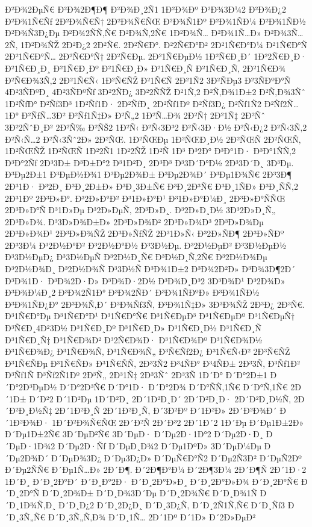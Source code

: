 {Ð²Ð¾2ÐµÑ€
Ð²Ð¾2Ð¶Ð¶
Ð²Ð¾Ð¸2Ñ1
1Ð²Ð¾Ðº
Ð²Ð¾3Ð¼2
Ð²Ð¾Ð¿2
Ð²Ð¾1Ñ€Ñƒ
2Ð²Ð¾Ñ€Ñ†
2Ð²Ð¾Ñ€ÑŒ
Ð²Ð¾Ñ1Ðº
Ð²Ð¾1ÑÐ¼
Ð²Ð¾1ÑÐ½
Ð²Ð¾Ñ3Ð¿Ðµ
Ð²Ð¾2ÑÑ‚Ñ€
Ð²Ð¾Ñ‚2Ñ€
1Ð²Ð¾Ñ…
Ð²Ð¾1Ñ…Ð»
Ð²Ð¾3Ñ…2Ñ‚
1Ð²Ð¾ÑŽ
2Ð²Ð¿2
2Ð²Ñ€.
2Ð²Ñ€Ð°.
Ð²2Ñ€Ð°Ð²
2Ð²1Ñ€Ð°Ð¼
Ð²1Ñ€Ð°Ñ
2Ð²1Ñ€Ð°Ñ…
2Ð²Ñ€Ð°Ñ†
2Ð²Ñ€Ðµ.
2Ð²1Ñ€ÐµÐ½
1Ð²Ñ€Ð¸Ð´
1Ð²2Ñ€Ð¸Ð·
Ð²1Ñ€Ð¸Ð¸
Ð²1Ñ€Ð¸Ðº
Ð²1Ñ€Ð¸Ð»
Ð²1Ñ€Ð¸Ñ
Ð²1Ñ€Ð¸Ñ‚
2Ð²1Ñ€Ð¾
Ð²Ñ€Ð¾3Ñ‚2
2Ð²1Ñ€Ñ‹
1Ð²Ñ€ÑŽ
Ð²1Ñ€Ñ
2Ð²1Ñ2
3Ð²ÑÐµ3
Ð²3ÑÐºÐ°Ñ
4Ð²3ÑÐºÐ¸
4Ð²3ÑÐºÑƒ
3Ð²2ÑÐ¿
3Ð²2ÑÑŽ
Ð²1Ñ‚2
Ð²Ñ‚Ð¾1Ð±2
Ð²Ñ‚Ð¾3Ñˆ
1Ð²ÑƒÐ°
Ð²Ñƒ3Ð³
1Ð²Ñƒ1Ð·
2Ð²ÑƒÐ¸
2Ð²Ñƒ1Ðº
Ð²Ñƒ3Ð¿
Ð²Ñƒ1Ñ2
Ð²Ñƒ2Ñ…1Ð°
Ð²ÑƒÑ…3Ð²
Ð²Ñƒ1Ñ‡Ð»
Ð²Ñ„2
1Ð²Ñ…Ð¾
2Ð²Ñ†
2Ð²1Ñ‡
2Ð²Ñˆ
3Ð²2ÑˆÐ¸Ð²
2Ð²Ñ‰
Ð²ÑŠ2
1Ð²Ñ‹
Ð²Ñ‹3Ð³2
Ð²Ñ‹3Ð·Ð½
Ð²Ñ‹Ð¿2
Ð²Ñ‹3Ñ‚2
Ð²Ñ‹Ñ…2
Ð²Ñ‹3Ñˆ2Ð»
2Ð²ÑŒ.
1Ð²ÑŒÐµ
1Ð²ÑŒÐ¸Ð½
2Ð²ÑŒÑ
2Ð²ÑŒÑ‚
1Ð²ÑŒÑŽ
1Ð²ÑŒÑ
1Ð²2Ñ1
1Ð²2ÑŽ
1Ð²Ñ
1Ð³
Ð³2Ð°
Ð³Ð°1Ð·
Ð³Ð°1ÑÑ‚2
Ð³Ð°2Ñƒ
2Ð³3Ð±
Ð³Ð±Ð°2
Ð³1Ð²Ð¸
2Ð³Ð³
Ð³3Ð´Ð°Ð½
2Ð³3Ð´Ð¸
3Ð³Ðµ.
Ð³Ðµ2Ð±1
Ð³ÐµÐ½Ð¾1
Ð³Ðµ2Ð¾Ð±
Ð³Ðµ2Ð¾Ð´
Ð³Ðµ1Ð¾Ñ€
2Ð³3Ð¶
2Ð³1Ð·
Ð³2Ð¸
Ð³Ð¸2Ð±Ð»
Ð³Ð¸3Ð±Ñ€
Ð³Ð¸2Ð³Ñ€
Ð³Ð¸1ÑÐ»
Ð³Ð¸ÑÑ‚2
2Ð³1Ðº
2Ð³Ð»Ð°.
Ð³2Ð»Ð°Ð²
Ð³1Ð»Ð°Ð¹
Ð³1Ð»Ð°Ð¼Ð¸
2Ð³Ð»Ð°ÑÑŒ
2Ð³Ð»Ð°Ñ
Ð³1Ð»Ðµ
Ð³2Ð»ÐµÑ‚
2Ð³Ð»Ð¸.
Ð³2Ð»Ð¸Ð½
3Ð³2Ð»Ð¸Ñ„
2Ð³Ð»Ð¾.
Ð³3Ð»Ð¾Ð±Ð»
2Ð³Ð»Ð¾Ð²
2Ð³Ð»Ð¾Ð³
2Ð³Ð»Ð¾Ðµ
2Ð³Ð»Ð¾Ð¹
2Ð³Ð»Ð¾ÑŽ
2Ð³Ð»ÑƒÑŽ
2Ð³1Ð»Ñ‹
Ð³2Ð»ÑÐ¶
2Ð³Ð»ÑÐº
2Ð³3Ð¼
Ð³2Ð½Ð°Ð²
Ð³2Ð½Ð°Ð½
Ð³3Ð½Ðµ.
Ð³2Ð½ÐµÐ²
Ð³3Ð½ÐµÐ½
Ð³3Ð½ÐµÐ¿
Ð³3Ð½ÐµÑ
Ð³2Ð½Ð¸Ñ€
Ð³Ð½Ð¸Ñ‚2Ñ€
Ð³2Ð½Ð¾Ðµ
Ð³2Ð½Ð¾Ð¸
Ð³2Ð½Ð¾Ñ
Ð³3Ð½Ñ
Ð³Ð¾1Ð±2
Ð³Ð¾2Ð²Ð»
Ð³Ð¾3Ð¶2Ð´
Ð³Ð¾1Ð·
Ð³Ð¾2Ð·Ð»
Ð³Ð¾Ð·2Ð½
Ð³Ð¾Ð¸Ð³2
3Ð³Ð¾Ð¹
Ð³2Ð¾Ð»
Ð³Ð¾Ð¼Ð¸2
Ð³Ð¾2Ñ1Ð°
Ð³Ð¾2ÑÐ´
Ð³Ð¾1ÑÐºÐ»
Ð³Ð¾1ÑÐ½
Ð³Ð¾1ÑÐ¿Ð°
2Ð³Ð¾Ñ‚Ð´
Ð³Ð¾Ñƒ3Ñ‚
Ð³Ð¾1Ñ‡Ð»
3Ð³Ð¾ÑŽ
2Ð³Ð¿
2Ð³Ñ€.
Ð³1Ñ€Ð°Ðµ
Ð³1Ñ€Ð°Ð¹
Ð³1Ñ€Ð°Ñ€
Ð³1Ñ€ÐµÐ³
Ð³1Ñ€ÐµÐº
Ð³1Ñ€ÐµÑ†
Ð³Ñ€Ð¸4Ð²3Ð½
Ð³1Ñ€Ð¸Ðº
Ð³1Ñ€Ð¸Ð»
Ð³1Ñ€Ð¸Ð½
Ð³1Ñ€Ð¸Ñ
Ð³1Ñ€Ð¸Ñ‡
Ð³1Ñ€Ð¾Ð²
Ð³2Ñ€Ð¾Ð·
Ð³1Ñ€Ð¾Ðº
Ð³1Ñ€Ð¾Ð½
Ð³1Ñ€Ð¾Ð¿
Ð³1Ñ€Ð¾Ñ‚
Ð³1Ñ€Ð¾Ñ„
Ð³Ñ€Ñƒ2Ð¿
Ð³1Ñ€Ñ‹Ð²
2Ð³Ñ€ÑŽ
Ð³1Ñ€ÑÐµ
Ð³1Ñ€ÑÐ»
Ð³1Ñ€ÑÑ‚
2Ð³3Ñ2
Ð³4ÑÐ°
Ð³4ÑÐ±
2Ð³3Ñ‚
Ð³Ñƒ1Ð²
Ð³Ñƒ1Ñ
Ð³Ñƒ2Ñ1Ðº
2Ð³Ñ„
2Ð³1Ñ‡
2Ð³3Ñˆ
2Ð³3Ñ
1Ð´Ð°
Ð´Ð°2Ð±1
Ð´Ð°2Ð³ÐµÐ½
Ð´Ð°2Ð³Ñ€
Ð´Ð°1Ð·
Ð´Ð°2Ð¾
Ð´Ð°ÑÑ‚1Ñ€
Ð´Ð°Ñ‚1Ñ€
2Ð´1Ð±
Ð´Ð²2
Ð´1Ð²Ðµ
1Ð´Ð²Ð¸
2Ð´1Ð²Ð¸Ð´
2Ð´Ð²Ð¸Ð·
2Ð´Ð²Ð¸Ð½Ñ‚
2Ð´Ð²Ð¸Ð½Ñ‡
2Ð´1Ð²Ð¸Ñ
2Ð´1Ð²Ð¸Ñ‚
Ð´3Ð²Ðº
Ð´1Ð²Ð»
2Ð´Ð²Ð¾Ð´
Ð´1Ð²Ð¾Ð·
1Ð´Ð²Ð¾Ñ€ÑŒ
2Ð´Ð²Ñ
2Ð´Ð³2
2Ð´1Ð´2
1Ð´Ðµ
Ð´Ðµ1Ð±2Ð»
Ð´Ðµ1Ð±2Ñ€
3Ð´ÐµÐ²Ñ€
3Ð´ÐµÐ·
Ð´Ðµ2Ð·1Ð°2
Ð´Ðµ2Ð·Ð¸
Ð´ÐµÐ·1Ð¾2
Ð´Ðµ2Ð·Ñƒ
Ð´ÐµÐ¸Ð¾2
Ð´Ðµ1ÐºÐ»
3Ð´ÐµÐ¼Ðµ
Ð´Ðµ2Ð¾Ð´
Ð´ÐµÐ¾3Ð¿
Ð´Ðµ3Ð¿Ð»
Ð´ÐµÑ€Ð°Ñ2
Ð´Ðµ2Ñ3Ð²
Ð´ÐµÑ2Ðº
Ð´Ðµ2ÑÑ€
Ð´Ðµ1Ñ…Ð»
2Ð´Ð¶.
Ð´2Ð¶Ð°Ð¼
Ð´2Ð¶3Ð¼
2Ð´Ð¶Ñ
2Ð´1Ð·2
1Ð´Ð¸
Ð´Ð¸2Ð°Ð´
Ð´Ð¸Ð°2Ð·
Ð´Ð¸2Ð°Ð»Ð¸
Ð´Ð¸2Ð°Ð»Ð¾
Ð´Ð¸2Ð°Ñ€
Ð´Ð¸2Ð°Ñ
Ð´Ð¸2Ð¾Ð±
Ð´Ð¸Ð¾3Ð´Ðµ
Ð´Ð¸2Ð¾Ñ€
Ð´Ð¸Ð¾1Ñ
Ð´Ð¸1Ð¾Ñ‚Ð¸
Ð´Ð¸Ð¿2
Ð´Ð¸2Ð¿Ð¸
Ð´Ð¸3Ð¿Ñ‚
Ð´Ð¸2Ñ1Ñ‚Ñ€
Ð´Ð¸Ñƒ3
Ð´Ð¸3Ñ„Ñ€
Ð´Ð¸3Ñ„Ñ‚Ð¾
Ð´Ð¸1Ñ…
2Ð´1Ðº
Ð´1Ð»
Ð´2Ð»ÐµÐ²
}
